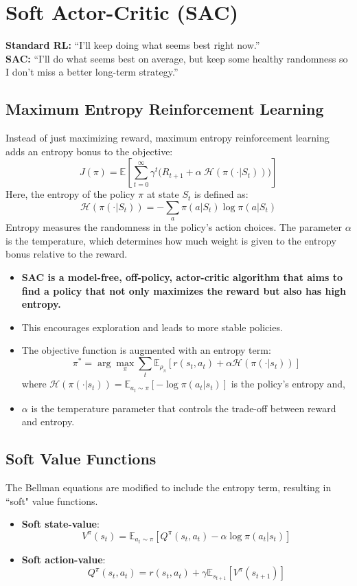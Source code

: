 \documentclass[12pt]{article}
\begin{document}
\section{Soft Actor-Critic (SAC) }

\textbf{Standard RL:} ``I'll keep doing what seems best right now.'' \\
\textbf{SAC:} ``I'll do what seems best on average, but keep some healthy randomness so I don't miss a better long-term strategy.''

\subsection{Maximum Entropy Reinforcement Learning}
Instead of just maximizing reward, maximum entropy reinforcement learning adds an entropy bonus to the objective:
$$
J(\pi) = \mathbb{E} \left[ \sum_{t=0}^{\infty} \gamma^t \big( R_{t+1} + \alpha \ \mathcal{H}(\pi(\cdot|S_t)) \big) \right]
$$
Here, the entropy of the policy $\pi$ at state $S_t$ is defined as:
$$
\mathcal{H}(\pi(\cdot|S_t)) = -\sum_a \pi(a|S_t) \log \pi(a|S_t)
$$
Entropy measures the randomness in the policy's action choices. The parameter $\alpha$ is the temperature, which determines how much weight is given to the entropy bonus relative to the reward.\\

\begin{itemize}
    \item \textbf{SAC is a model-free, off-policy, actor-critic algorithm that aims to find a policy that not only maximizes the reward but also has high entropy.}
    \item This encourages exploration and leads to more stable policies.
\end{itemize}

\begin{itemize}
    \item The objective function is augmented with an entropy term:
    $$ \pi^* = \arg\max_\pi \sum_t \mathbb{E}_{\rho_\pi} [r(s_t, a_t) + \alpha \mathcal{H}(\pi(\cdot|s_t))] $$
    where $\mathcal{H}(\pi(\cdot|s_t)) = \mathbb{E}_{a_t \sim \pi} [-\log \pi(a_t|s_t)]$ is the policy's entropy and,
    \item $\alpha$ is the temperature parameter that controls the trade-off between reward and entropy.
\end{itemize}

\subsection{Soft Value Functions}
The Bellman equations are modified to include the entropy term, resulting in ``soft" value functions.
\begin{itemize}
\textbf{Generally} : 
$$ V^\pi(s_t) = \mathbb{E}_{a_t \sim \pi} [Q^\pi(s_t, a_t)] $$
    \item \textbf{Soft state-value}:
    $$ V^\pi(s_t) = \mathbb{E}_{a_t \sim \pi} [Q^\pi(s_t, a_t) - \alpha \log \pi(a_t|s_t)] $$  
    \item \textbf{Soft action-value}:
    $$ Q^\pi(s_t, a_t) = r(s_t, a_t) + \gamma \mathbb{E}_{s_{t+1}} [V^\pi(s_{t+1})] $$
\end{itemize}
\end{document}
